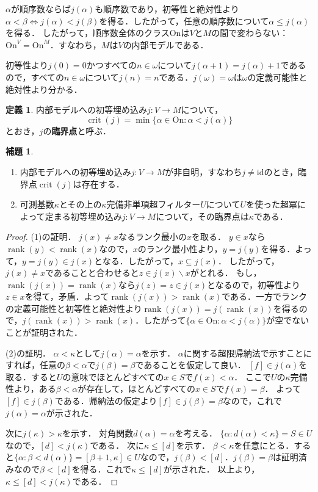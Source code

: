 \documentclass[uplatex]{jsarticle}
\newcommand{\Ordinals}{\mathrm{On}}
\newcommand{\rank}{\operatorname{rank}}
\newcommand{\id}{\mathrm{id}}
\newcommand{\crit}{\operatorname{crit}}
\renewcommand\subset{\subseteq}
\renewcommand{\setminus}{\smallsetminus}
\theoremstyle{definition}
\newtheorem{defi}[thm]{定義}
\newtheorem{lem}[thm]{補題}
\begin{document}
	$\alpha$が順序数ならば$j(\alpha)$も順序数であり，初等性と絶対性より$\alpha < \beta \iff j(\alpha) < j(\beta)$を得る．したがって，任意の順序数について$\alpha \le j(\alpha)$を得る．
	したがって，順序数全体のクラス$\Ordinals$は$V$と$M$の間で変わらない：$\Ordinals^V = \Ordinals^M$．すなわち，$M$は$V$の内部モデルである．
	
	初等性より$j(0) = 0$かつすべての$n \in \omega$について$j(\alpha+1) = j(\alpha)+1$であるので，すべての$n \in \omega$について$j(n) = n$である．$j(\omega) = \omega$は$\omega$の定義可能性と絶対性より分かる．
	
	\begin{defi}
		内部モデルへの初等埋め込み$j \colon V \to M$について，
		\[
		\crit(j) = \min \{ \alpha \in \Ordinals : \alpha < j(\alpha) \}
		\]
		とおき，$j$の\textbf{臨界点}と呼ぶ．
	\end{defi}
	
	\begin{lem}
		\begin{enumerate}
			\item 内部モデルへの初等埋め込み$j \colon V \to M$が非自明，すなわち$j \ne \id$のとき，臨界点$\crit(j)$は存在する．
			\item 可測基数$\kappa$とその上の$\kappa$完備非単項超フィルター$U$について$U$を使った超冪によって定まる初等埋め込み$j \colon V \to M$について，その臨界点は$\kappa$である．
		\end{enumerate}
	\end{lem}
	\begin{proof}
		(1)の証明．
		$j(x) \ne x$なるランク最小の$x$を取る．
		$y \in x$なら$\rank(y) < \rank(x)$なので，$x$のランク最小性より，$y = j(y)$を得る．よって，$y = j(y) \in j(x)$となる．したがって，$x \subset j(x)$．
		したがって，$j(x) \ne x$であることと合わせると$z \in j(x) \setminus x$がとれる．
		もし，$\rank(j(x)) = \rank(x)$なら$j(z) = z \in j(x)$となるので，初等性より$z \in x$を得て，矛盾．よって$\rank(j(x)) > \rank(x)$である．一方でランクの定義可能性と初等性と絶対性より$\rank(j(x)) = j(\rank(x))$を得るので，$j(\rank(x)) > \rank(x)$．したがって$\{ \alpha \in \Ordinals : \alpha < j(\alpha) \}$が空でないことが証明された．
		
		(2)の証明．
		$\alpha < \kappa$として$j(\alpha) = \alpha$を示す．
		$\alpha$に関する超限帰納法で示すことにすれば，任意の$\beta < \alpha$で$j(\beta) = \beta$であることを仮定して良い．
		$[f] \in j(\alpha)$を取る．すると$U$の意味でほとんどすべての$x \in S$で$f(x) < \alpha$．
		ここで$U$の$\kappa$完備性より，ある$\beta < \alpha$が存在して，ほとんどすべての$x \in S$で$f(x) = \beta$．
		よって$[f] \in j(\beta)$である．帰納法の仮定より$[f] \in j(\beta) = \beta$なので，これで$j(\alpha) = \alpha$が示された．
		
		次に$j(\kappa) > \kappa$を示す．
		対角関数$d(\alpha) = \alpha$を考える．
		$\{ \alpha : d(\alpha) < \kappa \} = S \in U$なので，$[d] < j(\kappa)$である．
		次に$\kappa \le [d]$を示す．
		$\beta < \kappa$を任意にとる．すると$\{ \alpha : \beta < d(\alpha) \} = [\beta+1, \kappa] \in U$なので，$j(\beta) < [d]$．$j(\beta) = \beta$は証明済みなので$\beta < [d]$を得る．これで$\kappa \le [d]$が示された．
		以上より，$\kappa \le [d] < j(\kappa)$である．
	\end{proof}
	
\end{document}
